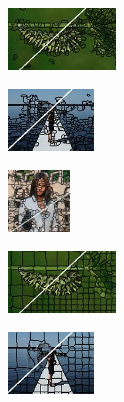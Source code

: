 \begin{figure}
	\begin{subfigure}[b]{0.02\textwidth}
	\end{subfigure}
	\begin{subfigure}[b]{0.16\textwidth}
		\includegraphics[height=1.65cm]{pictures/bsds500/poise/cropped/poise_35028_contours}
	\end{subfigure}
	\begin{subfigure}[b]{0.129\textwidth}
		\includegraphics[height=1.65cm]{pictures/sbd/poise/cropped/poise_0004774_contours}
	\end{subfigure}
	\begin{subfigure}[b]{0.10\textwidth}
		\includegraphics[height=1.65cm]{pictures/fash/poise/cropped/poise_010_contours}
	\end{subfigure}
	\begin{subfigure}[b]{0.02\textwidth}
	\end{subfigure}
	\begin{subfigure}[b]{0.16\textwidth}
		\includegraphics[height=1.65cm]{pictures/bsds500/seaw/cropped/seaw_35028_contours}
	\end{subfigure}
	\begin{subfigure}[b]{0.129\textwidth}
		\includegraphics[height=1.65cm]{pictures/sbd/seaw/cropped/seaw_0004774_contours}
	\end{subfigure}

\end{figure}
